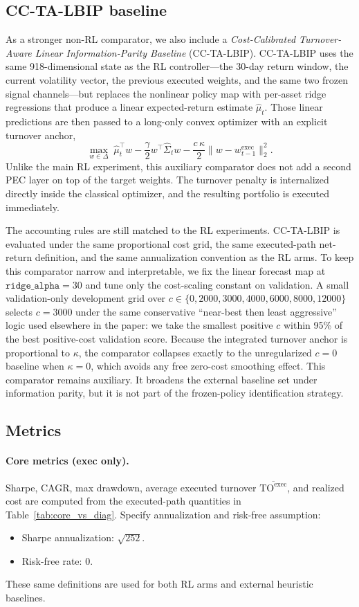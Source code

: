 \documentclass[10pt,twocolumn]{article}
\newcommand{\TOexec}{\mathrm{TO}^{\mathrm{exec}}}
\begin{document}
\subsection{CC-TA-LBIP baseline}
As a stronger non-RL comparator, we also include a \emph{Cost-Calibrated Turnover-Aware Linear Information-Parity Baseline} (CC-TA-LBIP). CC-TA-LBIP uses the same 918-dimensional state as the RL controller---the 30-day return window, the current volatility vector, the previous executed weights, and the same two frozen signal channels---but replaces the nonlinear policy map with per-asset ridge regressions that produce a linear expected-return estimate $\hat\mu_t$. Those linear predictions are then passed to a long-only convex optimizer with an explicit turnover anchor,
\[
\max_{w\in\Delta}\;
\hat\mu_t^\top w
- \frac{\gamma}{2}w^\top\hat\Sigma_t w
- \frac{c\,\kappa}{2}\|w-w^{\mathrm{exec}}_{t-1}\|_2^2.
\]
Unlike the main RL experiment, this auxiliary comparator does not add a second PEC layer on top of the target weights. The turnover penalty is internalized directly inside the classical optimizer, and the resulting portfolio is executed immediately.

The accounting rules are still matched to the RL experiments. CC-TA-LBIP is evaluated under the same proportional cost grid, the same executed-path net-return definition, and the same annualization convention as the RL arms. To keep this comparator narrow and interpretable, we fix the linear forecast map at $\texttt{ridge\_alpha}=30$ and tune only the cost-scaling constant on validation. A small validation-only development grid over $c\in\{0,2000,3000,4000,6000,8000,12000\}$ selects $c=3000$ under the same conservative ``near-best then least aggressive'' logic used elsewhere in the paper: we take the smallest positive $c$ within 95\% of the best positive-cost validation score. Because the integrated turnover anchor is proportional to $\kappa$, the comparator collapses exactly to the unregularized $c=0$ baseline when $\kappa=0$, which avoids any free zero-cost smoothing effect. This comparator remains auxiliary. It broadens the external baseline set under information parity, but it is not part of the frozen-policy identification strategy.

\subsection{Metrics}
\paragraph{Core metrics (exec only).}
Sharpe, CAGR, max drawdown, average executed turnover $\overline{\TOexec}$, and realized cost are computed from the executed-path quantities in Table~\ref{tab:core_vs_diag}. Specify annualization and risk-free assumption:
\begin{itemize}[leftmargin=*,itemsep=1pt]
\item Sharpe annualization: $\sqrt{252}$.
\item Risk-free rate: 0.
\end{itemize}
These same definitions are used for both RL arms and external heuristic baselines.
\end{document}
